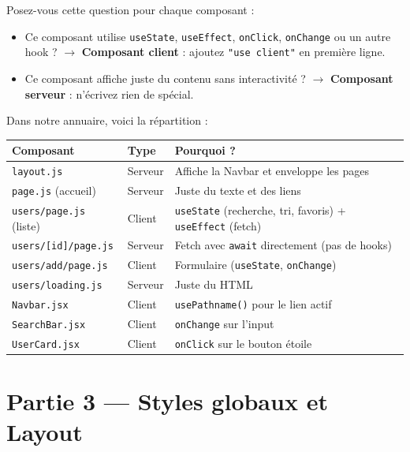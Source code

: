 \documentclass[11pt,a4paper]{article}
\begin{document}
\begin{retenirbox}
Posez-vous cette question pour chaque composant :

\begin{itemize}[nosep]
\item Ce composant utilise \texttt{useState}, \texttt{useEffect}, \texttt{onClick}, \texttt{onChange} ou un autre hook ? $\to$ \textbf{Composant client} : ajoutez \texttt{"use client"} en première ligne.
\item Ce composant affiche juste du contenu sans interactivité ? $\to$ \textbf{Composant serveur} : n'écrivez rien de spécial.
\end{itemize}
\end{retenirbox}

Dans notre annuaire, voici la répartition :

\begin{center}
\begin{tabular}{llp{5cm}}
\toprule
\textbf{Composant} & \textbf{Type} & \textbf{Pourquoi ?} \\
\midrule
\texttt{layout.js} & Serveur & Affiche la Navbar et enveloppe les pages \\
\texttt{page.js} (accueil) & Serveur & Juste du texte et des liens \\
\texttt{users/page.js} (liste) & Client & \texttt{useState} (recherche, tri, favoris) + \texttt{useEffect} (fetch) \\
\texttt{users/[id]/page.js} & Serveur & Fetch avec \texttt{await} directement (pas de hooks) \\
\texttt{users/add/page.js} & Client & Formulaire (\texttt{useState}, \texttt{onChange}) \\
\texttt{users/loading.js} & Serveur & Juste du HTML \\
\texttt{Navbar.jsx} & Client & \texttt{usePathname()} pour le lien actif \\
\texttt{SearchBar.jsx} & Client & \texttt{onChange} sur l'input \\
\texttt{UserCard.jsx} & Client & \texttt{onClick} sur le bouton étoile \\
\bottomrule
\end{tabular}
\end{center}

\section{Partie 3 --- Styles globaux et Layout}
\end{document}
